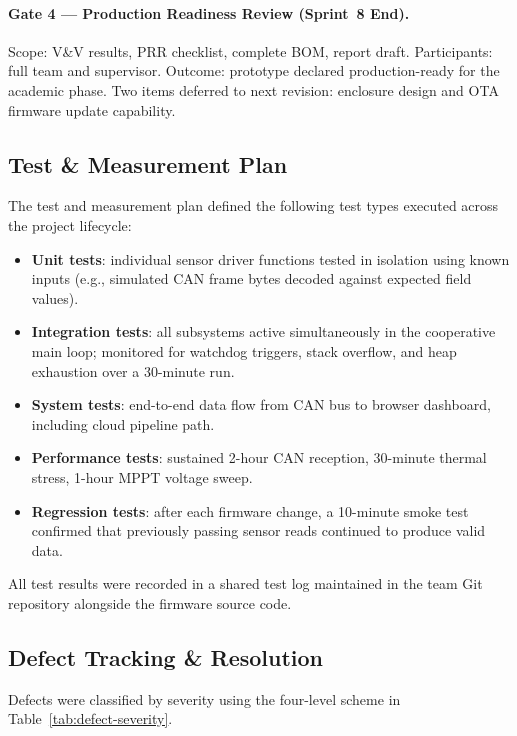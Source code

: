 \paragraph{Gate 4 --- Production Readiness Review (Sprint~8 End).}
Scope: V\&V results, PRR checklist, complete BOM, report draft. Participants: full team and supervisor. Outcome: prototype declared production-ready for the academic phase. Two items deferred to next revision: enclosure design and OTA firmware update capability.

\subsection{Test \& Measurement Plan}

The test and measurement plan defined the following test types executed across the project lifecycle:

\begin{itemize}
    \item \textbf{Unit tests}: individual sensor driver functions tested in isolation using known inputs (e.g., simulated CAN frame bytes decoded against expected field values).
    \item \textbf{Integration tests}: all subsystems active simultaneously in the cooperative main loop; monitored for watchdog triggers, stack overflow, and heap exhaustion over a 30-minute run.
    \item \textbf{System tests}: end-to-end data flow from CAN bus to browser dashboard, including cloud pipeline path.
    \item \textbf{Performance tests}: sustained 2-hour CAN reception, 30-minute thermal stress, 1-hour MPPT voltage sweep.
    \item \textbf{Regression tests}: after each firmware change, a 10-minute smoke test confirmed that previously passing sensor reads continued to produce valid data.
\end{itemize}

All test results were recorded in a shared test log maintained in the team Git repository alongside the firmware source code.

\subsection{Defect Tracking \& Resolution}

Defects were classified by severity using the four-level scheme in Table~\ref{tab:defect-severity}.

